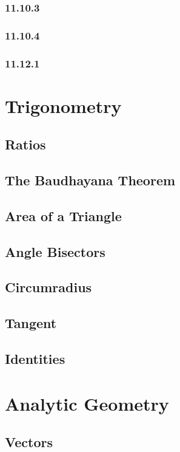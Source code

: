\documentclass[11pt]{book}
\begin{document}
\subsection{11.10.3}

\subsection{11.10.4}

\subsection{11.12.1}

\chapter{Trigonometry}
\section{Ratios}

\section{The Baudhayana Theorem}

%
\section{Area of a Triangle}

\section{Angle Bisectors}

\section{Circumradius}

\section{Tangent}

\section{Identities}

\chapter{Analytic Geometry}
\section{Vectors}

\end{document}
